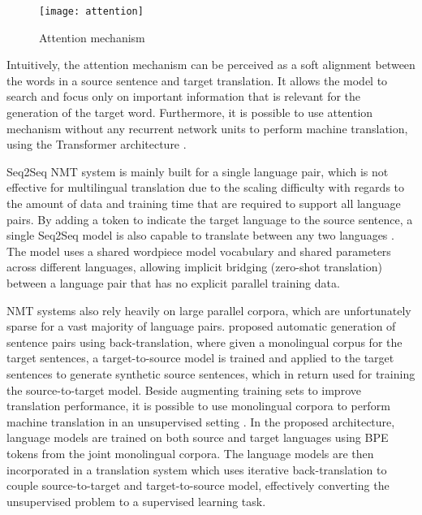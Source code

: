 \documentclass[12pt]{extarticle}
\begin{document}
\begin{figure}[ht]
\centering
\texttt{[image: attention]}
\caption{Attention mechanism}
\label{fig:attention}
\end{figure}

Intuitively, the attention mechanism can be perceived as a soft alignment between the words in a source sentence and target translation. It allows the model to search and focus only on important information that is relevant for the generation of the target word. Furthermore, it is possible to use attention mechanism without any recurrent network units to perform machine translation, using the Transformer architecture \citep{NIPS2017_7181}.%

Seq2Seq NMT system is mainly built for a single language pair, which is not effective for multilingual translation due to the scaling difficulty with regards to the amount of data and training time that are required to support all language pairs. By adding a token to indicate the target language to the source sentence, a single Seq2Seq model is also capable to translate between any two languages \citep{johnson-etal-2017-googles}. The model uses a shared wordpiece model vocabulary \citep{wordpiece} and shared parameters across different languages, allowing implicit bridging (zero-shot translation) between a language pair that has no explicit parallel training data.

NMT systems also rely heavily on large parallel corpora, which are unfortunately sparse for a vast majority of language pairs. \citep{sennrich-etal-2016-improving} proposed automatic generation of sentence pairs using back-translation, where given a monolingual corpus for the target sentences, a target-to-source model is trained and applied to the target sentences to generate synthetic source sentences, which in return used for training the source-to-target model. Beside augmenting training sets to improve translation performance, it is possible to use monolingual corpora to perform machine translation in an unsupervised setting \citep{lample-etal-2018-phrase}. In the proposed architecture, language models are trained on both source and target languages using BPE \citep{sennrich-etal-2016-neural} tokens from the joint monolingual corpora. The language models are then incorporated in a translation system which uses iterative back-translation to couple source-to-target and target-to-source model, effectively converting the unsupervised problem to a supervised learning task. 
\end{document}

